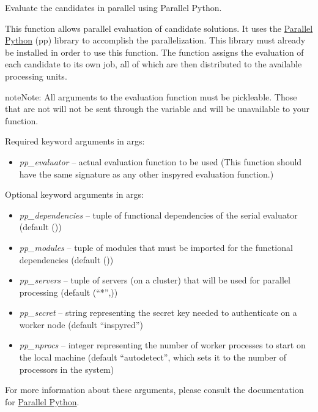 \documentclass[letterpaper,10pt,english]{sphinxmanual}
\begin{document}
\begin{fulllineitems}
\label{reference:inspyred.ec.evaluators.parallel_evaluation_pp}
Evaluate the candidates in parallel using Parallel Python.

This function allows parallel evaluation of candidate solutions.
It uses the \href{http://www.parallelpython.com}{Parallel Python}  (pp)
library to accomplish the parallelization. This library must already 
be installed in order to use this function. The function assigns the 
evaluation of each candidate to its own job, all of which are then 
distributed to the available processing units.

\begin{notice}{note}{Note:}
All arguments to the evaluation function must be pickleable.
Those that are not will not be sent through the  variable
and will be unavailable to your function.
\end{notice}

Required keyword arguments in args:
\begin{itemize}
\item {} 
\emph{pp\_evaluator} -- actual evaluation function to be used (This function
should have the same signature as any other inspyred evaluation function.)

\end{itemize}

Optional keyword arguments in args:
\begin{itemize}
\item {} 
\emph{pp\_dependencies} -- tuple of functional dependencies of the serial 
evaluator (default ())

\item {} 
\emph{pp\_modules} -- tuple of modules that must be imported for the 
functional dependencies (default ())

\item {} 
\emph{pp\_servers} -- tuple of servers (on a cluster) that will be used 
for parallel processing (default (``*'',))

\item {} 
\emph{pp\_secret} -- string representing the secret key needed to authenticate
on a worker node (default ``inspyred'')

\item {} 
\emph{pp\_nprocs} -- integer representing the number of worker processes to
start on the local machine (default ``autodetect'', which sets it to the
number of processors in the system)

\end{itemize}

For more information about these arguments, please consult the
documentation for \href{http://www.parallelpython.com}{Parallel Python}.

\end{fulllineitems}
\end{document}
